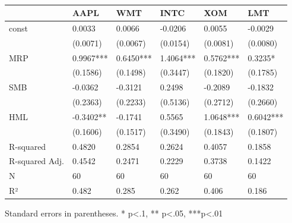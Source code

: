 \begin{table}
\caption{}
\label{}
\begin{center}
\begin{tabular}{llllll}
\hline
               & AAPL      & WMT       & INTC      & XOM       & LMT        \\
\hline
const          & 0.0033    & 0.0066    & -0.0206   & 0.0055    & -0.0029    \\
               & (0.0071)  & (0.0067)  & (0.0154)  & (0.0081)  & (0.0080)   \\
MRP            & 0.9967*** & 0.6450*** & 1.4064*** & 0.5762*** & 0.3235*    \\
               & (0.1586)  & (0.1498)  & (0.3447)  & (0.1820)  & (0.1785)   \\
SMB            & -0.0362   & -0.3121   & 0.2498    & -0.2089   & -0.1832    \\
               & (0.2363)  & (0.2233)  & (0.5136)  & (0.2712)  & (0.2660)   \\
HML            & -0.3402** & -0.1741   & 0.5565    & 1.0648*** & 0.6042***  \\
               & (0.1606)  & (0.1517)  & (0.3490)  & (0.1843)  & (0.1807)   \\
R-squared      & 0.4820    & 0.2854    & 0.2624    & 0.4057    & 0.1858     \\
R-squared Adj. & 0.4542    & 0.2471    & 0.2229    & 0.3738    & 0.1422     \\
N              & 60        & 60        & 60        & 60        & 60         \\
R²             & 0.482     & 0.285     & 0.262     & 0.406     & 0.186      \\
\hline
\end{tabular}
\end{center}
\end{table}
\bigskip
Standard errors in parentheses. \newline 
* p<.1, ** p<.05, ***p<.01